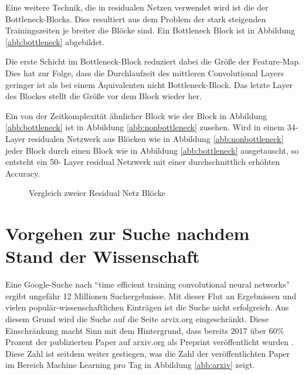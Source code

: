 Eine weitere Technik, die in residualen Netzen verwendet wird ist die der Bottleneck-Blocks. Dies resultiert aus dem Problem der stark steigenden Trainingszeiten je breiter die Blöcke sind. Ein Bottleneck Block ist in Abbildung \ref{abb:bottleneck} abgebildet.

Die erste Schicht im Bottleneck-Block reduziert dabei die Größe der Feature-Map. Dies hat zur Folge, dass die Durchlaufzeit des mittleren Convolutional Layers geringer ist als bei einem Äquivalenten nicht Bottleneck-Block. Das letzte Layer des Blockes stellt die Größe vor dem Block wieder her.

Ein von der Zeitkomplexität ähnlicher Block wie der Block in Abbildung \ref{abb:bottleneck} ist in Abbildung \ref{abb:nonbottleneck} zusehen. Wird in einem 34-Layer residualen Netzwerk aus Blöcken wie in Abbildung \ref{abb:nonbottleneck} jeder Block durch einen Block wie in Abbildung \ref{abb:bottleneck} ausgetauscht, so entsteht ein 50- Layer residual Netzwerk mit einer durchschnittlich erhöhten Accuracy. 


\begin{figure}[h]
 \centering
 \qquad
       \caption{Vergleich zweier Residual Netz Blöcke \cite{resnet}}
\end{figure}


\section{Vorgehen zur Suche nachdem Stand der Wissenschaft}
Eine Google-Suche nach ``time efficient training convolutional neural networks'' ergibt ungefähr 12 Millionen Suchergebnisse. Mit dieser Flut an Ergebnissen und vielen populär-wissenschaftlichen Einträgen ist die Suche nicht erfolgreich. Aus diesem Grund wird die Suche auf die Seite arvix.org eingeschränkt. Diese Einschränkung macht Sinn mit dem Hintergrund, dass bereits 2017 über 60\% Prozent der publizierten Paper auf arxiv.org als Preprint veröffentlicht wurden \cite{popular}. Diese Zahl ist seitdem weiter gestiegen, was die Zahl der veröffentlichten Paper im Bereich Machine Learning pro Tag in Abbildung \ref{abb:arxiv} zeigt.


